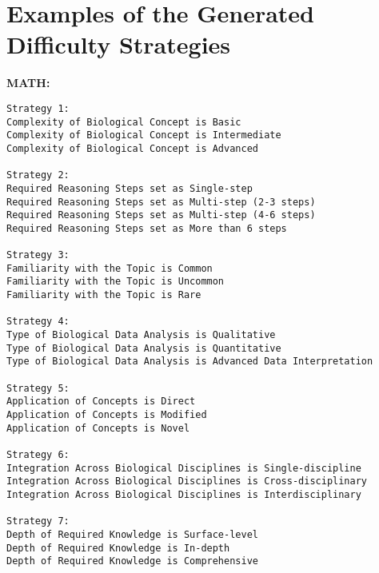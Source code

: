 \section{Examples of the Generated Difficulty Strategies}
\label{sec:strategies}
\textbf{MATH:}
\begin{lstlisting}
Strategy 1:
Complexity of Biological Concept is Basic
Complexity of Biological Concept is Intermediate
Complexity of Biological Concept is Advanced

Strategy 2:
Required Reasoning Steps set as Single-step
Required Reasoning Steps set as Multi-step (2-3 steps)
Required Reasoning Steps set as Multi-step (4-6 steps)
Required Reasoning Steps set as More than 6 steps

Strategy 3:
Familiarity with the Topic is Common
Familiarity with the Topic is Uncommon
Familiarity with the Topic is Rare

Strategy 4:
Type of Biological Data Analysis is Qualitative
Type of Biological Data Analysis is Quantitative
Type of Biological Data Analysis is Advanced Data Interpretation

Strategy 5:
Application of Concepts is Direct
Application of Concepts is Modified
Application of Concepts is Novel

Strategy 6:
Integration Across Biological Disciplines is Single-discipline
Integration Across Biological Disciplines is Cross-disciplinary
Integration Across Biological Disciplines is Interdisciplinary

Strategy 7:
Depth of Required Knowledge is Surface-level
Depth of Required Knowledge is In-depth
Depth of Required Knowledge is Comprehensive
\end{lstlisting}


